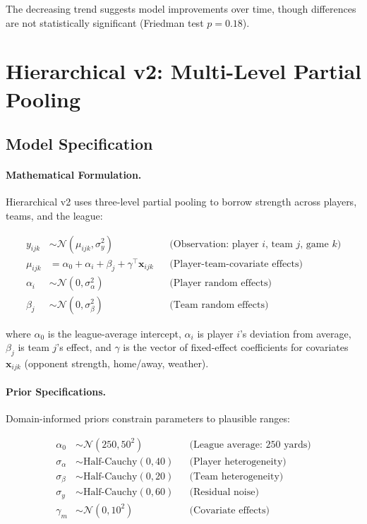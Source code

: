 \noindent The decreasing trend suggests model improvements over time, though differences are not statistically significant (Friedman test $p = 0.18$).

\section{Hierarchical v2: Multi-Level Partial Pooling}
\label{sec:hierarchical-v2}

\subsection{Model Specification}

\paragraph{Mathematical Formulation.}
Hierarchical v2 uses three-level partial pooling to borrow strength across players, teams, and the league:

\begin{align}
\label{eq:hierarchical-observation}
y_{ijk} &\sim \mathcal{N}(\mu_{ijk}, \sigma_y^2) && \text{(Observation: player $i$, team $j$, game $k$)} \\
\label{eq:hierarchical-player}
\mu_{ijk} &= \alpha_0 + \alpha_i + \beta_j + \gamma^\top \mathbf{x}_{ijk} && \text{(Player-team-covariate effects)} \\
\label{eq:hierarchical-player-intercept}
\alpha_i &\sim \mathcal{N}(0, \sigma_\alpha^2) && \text{(Player random effects)} \\
\label{eq:hierarchical-team-intercept}
\beta_j &\sim \mathcal{N}(0, \sigma_\beta^2) && \text{(Team random effects)}
\end{align}

\noindent where $\alpha_0$ is the league-average intercept, $\alpha_i$ is player $i$'s deviation from average, $\beta_j$ is team $j$'s effect, and $\gamma$ is the vector of fixed-effect coefficients for covariates $\mathbf{x}_{ijk}$ (opponent strength, home/away, weather).

\paragraph{Prior Specifications.}
Domain-informed priors constrain parameters to plausible ranges:

\begin{align}
\label{eq:hierarchical-priors}
\alpha_0 &\sim \mathcal{N}(250, 50^2) && \text{(League average: 250 yards)} \\
\sigma_\alpha &\sim \text{Half-Cauchy}(0, 40) && \text{(Player heterogeneity)} \\
\sigma_\beta &\sim \text{Half-Cauchy}(0, 20) && \text{(Team heterogeneity)} \\
\sigma_y &\sim \text{Half-Cauchy}(0, 60) && \text{(Residual noise)} \\
\gamma_m &\sim \mathcal{N}(0, 10^2) && \text{(Covariate effects)}
\end{align}

